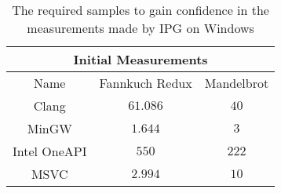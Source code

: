 \begin{table}[H]
    \centering
    \begin{tabular}{|| c | c | c ||}
    \hline
    \multicolumn{3}{||c||}{Initial Measurements} \\ [0.5ex] \hline\hline
    Name & Fannkuch Redux & Mandelbrot \\\hline
    Clang & $61.086$ & $40$ \\
    MinGW & $1.644$ & $3$ \\
    Intel OneAPI & $550$ & $222$ \\
    MSVC & $2.994$ & $10$ \\\hline
    \end{tabular}
    \caption{The required samples to gain confidence in the measurements made by IPG on Windows}
    \label{tab:initial-measurements}
\end{table}